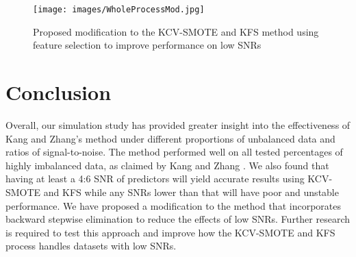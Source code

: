 \documentclass[a4paper, 12pt]{article}
\begin{document}
\begin{figure}[h]
\begin{center}
\texttt{[image: images/WholeProcessMod.jpg]}
\caption{Proposed modification to the KCV-SMOTE and KFS method using feature selection to improve performance on low SNRs}
\label{fig:wholeProcessMod}
\end{center}
\end{figure}

\section{Conclusion}
Overall, our simulation study has provided greater insight into the effectiveness of Kang and Zhang's method \cite{kcvSmoteStudy} under different proportions of unbalanced data and ratios of signal-to-noise. The method performed well on all tested percentages of highly imbalanced data, as claimed by Kang and Zhang \cite{kcvSmoteStudy}. We also found that having at least a 4:6 SNR of predictors will yield accurate results using KCV-SMOTE and KFS while any SNRs lower than that will have poor and unstable performance. We have proposed a modification to the method that incorporates backward stepwise elimination to reduce the effects of low SNRs. Further research is required to test this approach and improve how the KCV-SMOTE and KFS process handles datasets with low SNRs.
		
\newpage
		


\end{document}
